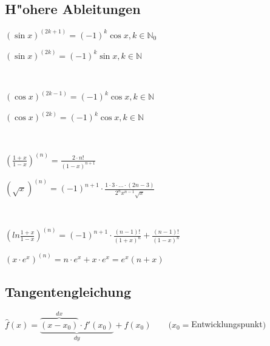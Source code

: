 \subsection{H"ohere Ableitungen}
	\begin{minipage}[t]{9.5cm} 
		$ (\sin x)^{(2k+1)} = (-1)^k \cos x, k \in \mathbb{N}_0 $ 
	\end{minipage} 
	\begin{minipage}[t]{9.5cm} 
		$ (\sin x)^{(2k)} = (-1)^k \sin x, k \in \mathbb{N} $
	\end{minipage} \\
	\begin{minipage}[t]{9.5cm} 
		$ (\cos x)^{(2k-1)} = (-1)^k \cos x, k \in \mathbb{N} $ 
	\end{minipage} 
	\begin{minipage}[t]{9.5cm} 
		$ (\cos x)^{(2k)} = (-1)^k \cos x, k \in \mathbb{N} $
	\end{minipage} \\
	\begin{minipage}[t]{9.5cm} 
		$ \left(\frac{1+x}{1-x}\right)^{(n)} = \frac{2 \cdot n!}{(1-x)^{n+1}} $
	\end{minipage} 
	\begin{minipage}[t]{9.5cm} 
		$ (\sqrt{x})^{(n)} = (-1)^{n+1} \cdot \frac{1 \cdot 3 \cdot ... \cdot (2n-3)}{2^n x^{n-1} \sqrt{x}} $
	\end{minipage}  \\
	\begin{minipage}[t]{9.5cm} 
		$ \left(ln\frac{1+x}{1-x}\right)^{(n)} = (-1)^{n+1} \cdot \frac{(n-1)!}{(1+x)^n} + \frac{(n-1)!}{(1-x)^n}$
	\end{minipage} 
	\begin{minipage}[t]{9.5cm} 
		$ (x \cdot e^{x})^{(n)} = n \cdot e^x + x \cdot e^x = e^x (n + x)$
	\end{minipage} 
	
\subsection{Tangentengleichung}
	$\hat{f}(x) = \underbrace{\overbrace{(x - x_0)}^{dx} \cdot f'(x_0)}_{dy} + f(x_0) \qquad (x_0 = $Entwicklungspunkt$)$ 


